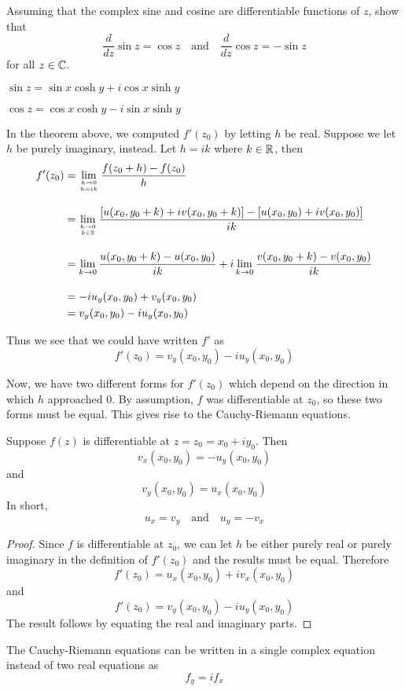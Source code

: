 \documentclass[handout]{ximera}
\begin{document}
\begin{problem}
Assuming that the complex sine and cosine are differentiable functions of $z$, show that
\[
\frac{d}{dz} \sin z = \cos z \quad \mbox{and} \quad \frac{d}{dz} \cos z = -\sin z
\]
for all $z \in \mathbb C$.
\begin{hint}
$\sin z = \sin x \cosh y + i \cos x \sinh y$
\end{hint}
\begin{hint}
$\cos z = \cos x \cosh y - i \sin x \sinh y$
\end{hint}
\end{problem}


In the theorem above, we computed $f'(z_0)$ by letting $h$ be real.  
Suppose we let $h$ be purely imaginary, instead.
Let $h = ik$ where $k \in \mathbb R$, then
\begin{align*}
f'(z_0) &= \lim_{h \to 0 \atop h = ik} \frac{f(z_0 + h) -f(z_0)}{h} \\[10pt]
        &= \lim_{k \to 0 \atop k \in \mathbb R} \frac{\left[u(x_0 , y_0+k) + iv(x_0 , y_0+k)\right] -
         \left[u(x_0,y_0)+iv(x_0, y_0)\right]}{ik} \\[10pt]
        &=  \lim_{k \to 0} \frac{u(x_0 , y_0+k)- u(x_0,y_0)}{ik} +
        i\lim_{k \to 0}\frac{v(x_0 , y_0+k)-v(x_0, y_0)}{ik} \\[10pt]
        &= -iu_y(x_0,y_0) + v_y(x_0,y_0)\\
        &=  v_y(x_0,y_0)-iu_y(x_0,y_0)
\end{align*}

Thus we see that we could have written $f'$ as
\[
f'(z_0) = v_y(x_0,y_0)-iu_y(x_0,y_0)
\]

Now, we have two different forms for $f'(z_0)$ which depend on the direction in which $h$ approached $0$.
By assumption, $f$ was differentiable at $z_0$, so these two forms must be equal. 
This gives rise to the Cauchy-Riemann equations.


\begin{theorem}
Suppose $f(z)$ is differentiable at $z = z_0 = x_0 +iy_0$. Then
\[
v_x(x_0,y_0)= -u_y(x_0,y_0) 
\]
and 
\[
v_y(x_0,y_0) = u_x(x_0,y_0)
\]
In short, 
\[
u_x =v_y \quad \mbox{and} \quad u_y = -v_x
\]
\end{theorem}


\begin{proof}
Since $f$ is differentiable at $z_0$, we can let $h$ be either purely real or 
purely imaginary in the definition of $f'(z_0)$
and the results must be equal. Therefore
\[
f'(z_0) = u_x(x_0,y_0)+iv_x(x_0,y_0)
\]
and
\[
f'(z_0) = v_y(x_0,y_0)-iu_y(x_0,y_0)
\]
The result follows by equating the real and imaginary parts.
\end{proof}
\begin{remark}
The Cauchy-Riemann equations can be written in a single complex equation instead of two real equations as
\[
f_y = if_x
\]
\end{remark}
\end{document}
